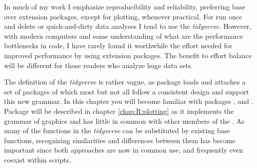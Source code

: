 \documentclass[krantz2]{krantz}\usepackage{knitr}
\begin{document}
In much of my work I emphasize reproducibility and reliability, preferring base \Rlang over extension packages, except for plotting, whenever practical. For run once and delete or quick-and-dirty data analyses I tend to use the \emph{tidyverse}. However, with modern computers and some understanding of what are the performance bottlenecks in \Rlang code, I have rarely found it worthwhile the effort needed for improved performance by using extension packages. The benefit to effort balance will be different for those readers who analyze huge data sets.

The definition of the \emph{tidyverse} is rather vague, as package  loads and attaches a set of packages of which most but not all follow a consistent design and support this new grammar. In this chapter you will become familiar with packages ,  and . Package  will be described in chapter \ref{chap:R:plotting} as it implements the grammar of graphics and has little in common with other members of the . As many of the functions in the \emph{tidyverse} can be substituted by existing base \Rlang functions, recognizing similarities and differences between them has become important since both approaches are now in common use, and frequently even coexist within \Rlang scripts.
\end{document}
